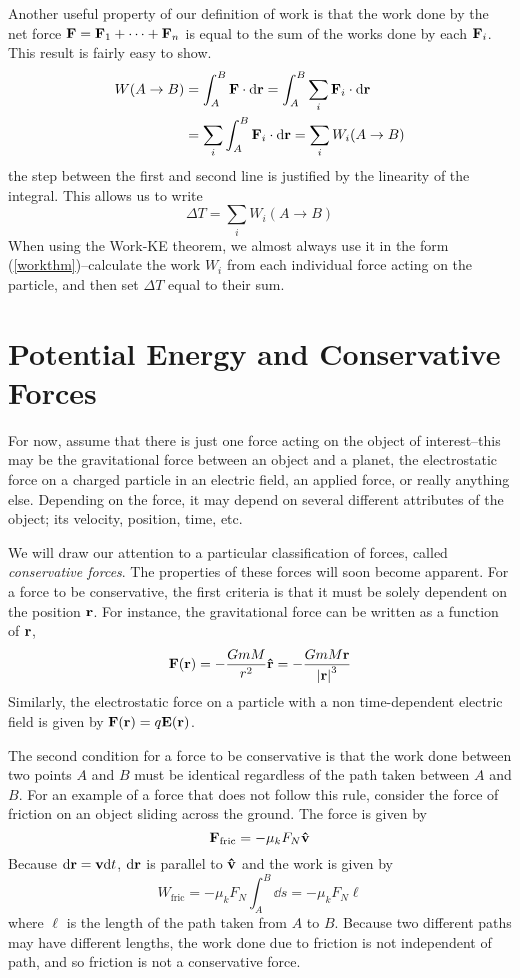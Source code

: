 Another useful property of our definition of work is that the work done by the net force $\mathbf{F} = \mathbf{F}_1 + \cdots + \mathbf{F}_n$ is equal to the sum of the works done by each $\mathbf{F}_i$. This result is fairly easy to show.
\begin{align*}
    W(A\to B) &= \int_A^B \mathbf{F}\cdot\dd\mathbf{r} = \int_A^B \sum_i \mathbf{F}_i \cdot \dd \mathbf{r} \\
    &= \sum_i \int_A^B \mathbf{F}_i \cdot \dd \mathbf{r} = \sum_i W_i(A\to B)
\end{align*}
the step between the first and second line is justified by the linearity of the integral. This allows us to write
\begin{equation}\label{workthm}
    \Delta T = \sum_i W_i(A\to B)
\end{equation}
When using the Work-KE theorem, we almost always use it in the form (\ref{workthm})--calculate the work $W_i$ from each individual force acting on the particle, and then set $\Delta T$ equal to their sum. 
\section{Potential Energy and Conservative Forces}
For now, assume that there is just one force acting on the object of interest--this may be the gravitational force between an object and a planet, the electrostatic force on a charged particle in an electric field, an applied force, or really anything else. Depending on the force, it may depend on several different attributes of the object; its velocity, position, time, etc.

We will draw our attention to a particular classification of forces, called \textit{conservative forces}. The properties of these forces will soon become apparent. For a force to be conservative, the first criteria is that it must be solely dependent on the position $\mathbf{r}$. For instance, the gravitational force can be written as a function of $\mathbf{r}$,
\begin{equation} \label{gforc}
    \mathbf{F}(\mathbf{r}) = -\frac{GmM}{r^2}\mathbf{\hat{r}} = -\frac{GmM\mathbf{r}}{\abs{\mathbf{r}}^3}
\end{equation}
Similarly, the electrostatic force on a particle with a non time-dependent electric field is given by $\mathbf{F}(\mathbf{r}) = q\mathbf{E}(\mathbf{r})$.

The second condition for a force to be conservative is that the work done between two points $A$ and $B$ must be identical regardless of the path taken between $A$ and $B$. For an example of a force that does not follow this rule, consider the force of friction on an object sliding across the ground. The force is given by
\[ \mathbf{F}_\text{fric} = -\mu_k F_N \mathbf{\hat v} \]
Because $\dd\mathbf{r} = \mathbf{v}\dd t$, $\dd \mathbf{r}$ is parallel to $\mathbf{\hat v}$ and the work is given by
\[ W_\text{fric} = -\mu_k F_N \int_A^B \dd s = -\mu_k F_N \ell \]
where $\ell$ is the length of the path taken from $A$ to $B$. Because two different paths may have different lengths, the work done due to friction is not independent of path, and so friction is not a conservative force. 

